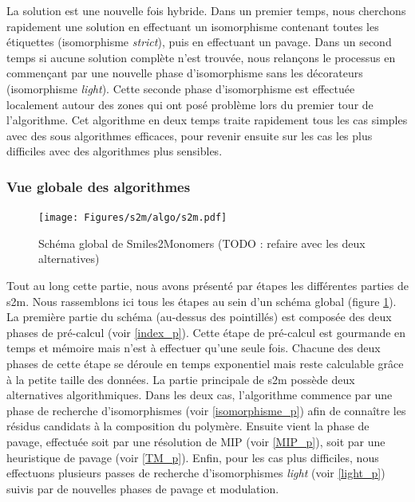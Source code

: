 La solution est une nouvelle fois hybride.
Dans un premier temps, nous cherchons rapidement une solution en effectuant un
isomorphisme contenant toutes les étiquettes (isomorphisme {\em strict}), puis en effectuant un pavage.
Dans un second temps si aucune solution complète n'est trouvée, nous relançons le processus en commençant par
une nouvelle phase d'isomorphisme sans les décorateurs (isomorphisme \textit{light}).
Cette seconde phase d'isomorphisme est effectuée localement autour des zones qui ont posé problème lors du premier tour de 
l'algorithme.
Cet algorithme en deux temps traite rapidement tous les cas simples avec des sous algorithmes efficaces, pour revenir ensuite sur les cas les plus difficiles avec des algorithmes plus sensibles.

\subsubsection{Vue globale des algorithmes}

\begin{figure}
  \begin{center}
    \texttt{[image: Figures/s2m/algo/s2m.pdf]}
    \caption{\label{global_s2m}Schéma global de Smiles2Monomers (TODO : refaire avec les deux alternatives)}
  \end{center}
\end{figure}

Tout au long cette partie, nous avons présenté par étapes les différentes parties de s2m.
Nous rassemblons ici tous les étapes au sein d'un schéma global (figure \ref{global_s2m}).
La première partie du schéma (au-dessus des pointillés) est composée des deux phases de pré-calcul (voir \ref{index_p}).
Cette étape de pré-calcul est gourmande en temps et mémoire mais n'est à effectuer qu'une seule fois.
Chacune des deux phases de cette étape se déroule en temps exponentiel mais reste calculable grâce à la petite taille des
données.
La partie principale de s2m possède deux alternatives algorithmiques.
Dans les deux cas, l'algorithme commence par une phase de recherche d'isomorphismes (voir \ref{isomorphisme_p}) afin de connaître les résidus candidats à la composition du polymère.
Ensuite vient la phase de pavage, effectuée soit par une résolution de MIP (voir \ref{MIP_p}), soit par une heuristique de pavage (voir \ref{TM_p}).
Enfin, pour les cas plus difficiles, nous effectuons plusieurs passes de recherche d'isomorphismes \textit{light} (voir \ref{light_p}) suivis par de nouvelles phases de pavage et modulation.

